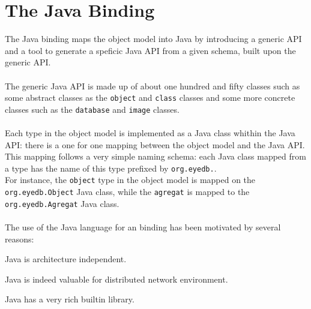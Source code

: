 

\newcommand{\mantitle}{\textsc{Java Binding}}


\tableofcontents

\chapter{The Java Binding}


The Java binding maps the \eyedb object model into Java by introducing
a generic API
and a tool to generate a speficic Java API from a given schema,
built upon the generic API.
\\
\\
The generic Java API is made up of about one hundred and fifty classes such
as some abstract classes as the \texttt{object} and \texttt{class} classes
and some more concrete classes such as the \texttt{database} and \texttt{image}
classes.
\\
\\
Each type in the \eyedb object model is implemented as a Java class whithin
the Java API: there is a one for one mapping between the object model and
the Java API.
\\
This mapping follows a very simple naming schema: each Java class mapped from
a type has the name of this type prefixed by \texttt{org.eyedb.}.
\\
For instance, the \texttt{object} type in the \eyedb object model is
mapped on the \texttt{org.eyedb.Object} Java class, while the
\texttt{agregat} is mapped to the \texttt{org.eyedb.Agregat} Java class.
\\
\\
The use of the Java language for an \eyedb binding has been motivated by
several reasons:
\bi
\item Java is architecture independent.
\item Java is indeed valuable for distributed network environment.
\item Java has a very rich builtin library.
